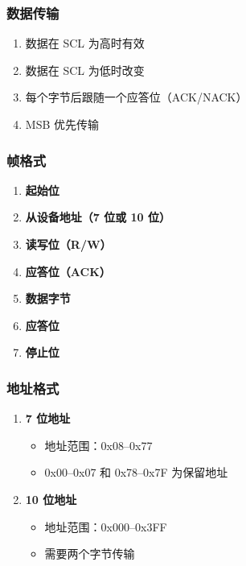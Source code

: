 \subsubsection{数据传输}

\begin{enumerate}
  \item 数据在 SCL 为高时有效
  \item 数据在 SCL 为低时改变
  \item 每个字节后跟随一个应答位（ACK/NACK）
  \item MSB 优先传输
\end{enumerate}

\subsubsection{帧格式}

\begin{enumerate}
  \item \textbf{起始位}
  \item \textbf{从设备地址（7 位或 10 位）}
  \item \textbf{读写位（R/W）}
  \item \textbf{应答位（ACK）}
  \item \textbf{数据字节}
  \item \textbf{应答位}
  \item \textbf{停止位}
\end{enumerate}

\subsubsection{地址格式}

\begin{enumerate}
  \item \textbf{7 位地址}
    \begin{itemize}
      \item 地址范围：0x08--0x77
      \item 0x00--0x07 和 0x78--0x7F 为保留地址
    \end{itemize}

  \item \textbf{10 位地址}
    \begin{itemize}
      \item 地址范围：0x000--0x3FF
      \item 需要两个字节传输
    \end{itemize}
\end{enumerate}

